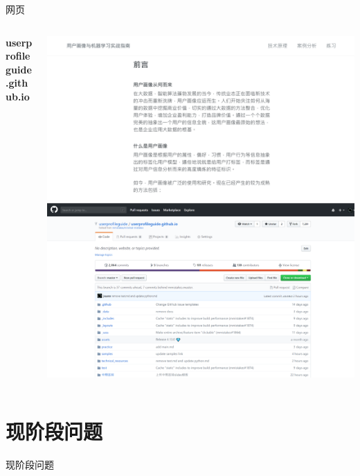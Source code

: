 \documentclass[10pt]{beamer}
\begin{document}
\begin{frame}{网页}
\begin{columns}
  \begin{column}{0.4\textwidth}
    \textbf{userprofileguide.github.io}
  \end{column}
  \begin{column}{0.6\textwidth}
    \includegraphics[height=0.4\paperheight]{website1}
    \includegraphics[height=0.4\paperheight]{website2}
  \end{column}
  \end{columns}
\end{frame}


\section{现阶段问题}
  \begin{frame}{现阶段问题}

  \end{frame}

\end{document}
